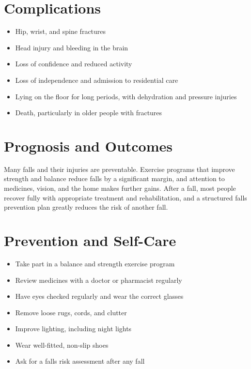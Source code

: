 \section*{Complications}
\begin{itemize}
    \item Hip, wrist, and spine fractures
    \item Head injury and bleeding in the brain
    \item Loss of confidence and reduced activity
    \item Loss of independence and admission to residential care
    \item Lying on the floor for long periods, with dehydration and pressure injuries
    \item Death, particularly in older people with fractures
\end{itemize}

\section*{Prognosis and Outcomes}
Many falls and their injuries are preventable. Exercise programs that improve strength and balance reduce falls by a significant margin, and attention to medicines, vision, and the home makes further gains. After a fall, most people recover fully with appropriate treatment and rehabilitation, and a structured falls prevention plan greatly reduces the risk of another fall.

\section*{Prevention and Self-Care}
\begin{itemize}
    \item Take part in a balance and strength exercise program
    \item Review medicines with a doctor or pharmacist regularly
    \item Have eyes checked regularly and wear the correct glasses
    \item Remove loose rugs, cords, and clutter
    \item Improve lighting, including night lights
    \item Wear well-fitted, non-slip shoes
    \item Ask for a falls risk assessment after any fall
\end{itemize}

